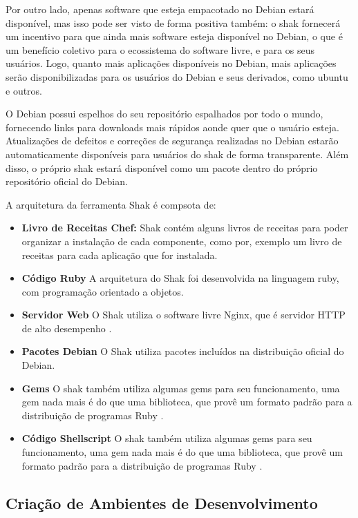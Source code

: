 Por outro lado, apenas software que esteja empacotado no Debian estará
disponível, mas isso pode ser visto de forma positiva também: o shak
fornecerá um incentivo para que ainda mais software esteja disponível no
Debian, o que é um benefício coletivo para o ecossistema do software livre, e
para os seus usuários. Logo, quanto mais aplicações disponíveis no Debian,
mais aplicações serão disponibilizadas para os usuários do Debian e seus derivados,
como ubuntu e outros.

O Debian possui espelhos do seu repositório espalhados por todo o mundo,
fornecendo links para downloads mais rápidos aonde quer que o usuário esteja.
Atualizações de defeitos e correções de segurança realizadas no Debian estarão
automaticamente disponíveis para usuários do shak de forma transparente. Além disso,
o próprio shak estará disponível como um pacote dentro do próprio repositório oficial do Debian.

A arquitetura da ferramenta Shak é compsota de:

\begin{itemize}
  \item  \textbf{Livro de Receitas Chef:} Shak contém alguns livros de receitas
  para poder organizar a instalação de cada componente, como por, exemplo um livro
  de receitas para cada aplicação que for instalada.
  \item  \textbf{Código Ruby} A arquitetura do Shak foi desenvolvida na linguagem
  ruby, com programação orientado a objetos.
  \item  \textbf{Servidor Web} O Shak utiliza o software livre Nginx, que é
  servidor HTTP de alto desempenho \cite{nginx}.
  \item  \textbf{Pacotes Debian} O Shak utiliza pacotes incluídos na distribuição
  oficial do Debian.
  \item  \textbf{Gems} O shak também utiliza algumas gems para seu funcionamento,
  uma gem nada mais é do que uma biblioteca, que provê um formato padrão para
  a distribuição de programas Ruby \cite{gem}.
  \item  \textbf{Código Shellscript} O shak também utiliza algumas gems para seu funcionamento,
  uma gem nada mais é do que uma biblioteca, que provê um formato padrão para
  a distribuição de programas Ruby \cite{gem}.
\end{itemize}

\subsection{Criação de Ambientes de Desenvolvimento}

